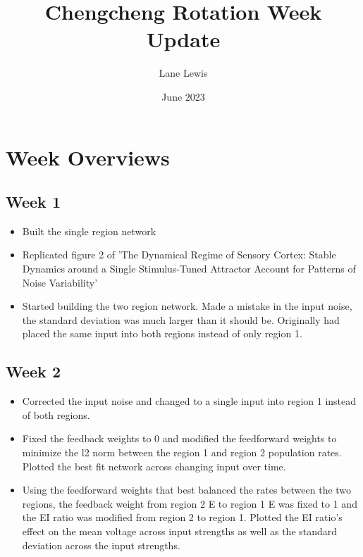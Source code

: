 \documentclass[10pt]{article}
\title{Chengcheng Rotation Week Update}
\author{Lane Lewis}
\date{June 2023}
\begin{document}
\maketitle
\section{Week Overviews}
\subsection{Week 1}
\begin{itemize}
    \item Built the single region network
    \item Replicated figure 2 of 'The Dynamical Regime of Sensory Cortex: Stable Dynamics around a Single Stimulus-Tuned Attractor Account for Patterns of Noise Variability'
    \item Started building the two region network. Made a mistake in the input noise, the standard deviation was much larger than it should be. Originally had placed the same input into both regions instead of only region 1.
\end{itemize}
\subsection{Week 2}
\begin{itemize}
    \item Corrected the input noise and changed to a single input into region 1 instead of both regions. 
    \item Fixed the feedback weights to 0 and modified the feedforward weights to minimize the l2 norm between the region 1 and region 2 population rates. Plotted the best fit network across changing input over time.
    \item Using the feedforward weights that best balanced the rates between the two regions, the feedback weight from region 2 E to region 1 E was fixed to 1 and the EI ratio was modified from region 2 to region 1. Plotted the EI ratio's effect on the mean voltage across input strengths as well as the standard deviation across the input strengths.
\end{itemize}
\end{document}
